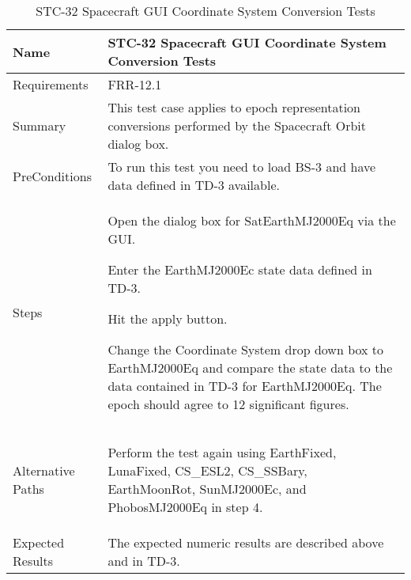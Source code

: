 
\begin{table}[htbp!]
\centering
      \begin{tabular}{|p{1.05 in} |p{4.75 in} |}
      \hline
         \rowcolor[rgb]{0.8,0.8,0.8} Name & STC-32 Spacecraft GUI Coordinate System Conversion Tests\\
         \hline
         Requirements & FRR-12.1\\ \hline
         Summary &
         This test case applies to epoch representation conversions performed by the Spacecraft Orbit dialog box.  \\
         \hline
         PreConditions & To run this test you need to load BS-3 and have data defined in TD-3 available.\\
         \hline
         Steps &
         \begin{compactenum}
         \item Open the dialog box for SatEarthMJ2000Eq via the GUI.
         \item Enter the EarthMJ2000Ec state data  defined in TD-3.
         \item Hit the apply button.
         \item Change the Coordinate System drop down box to EarthMJ2000Eq and compare the state data to
               the data contained in TD-3 for EarthMJ2000Eq. The epoch should agree to 12 significant
               figures.
         \end{compactenum}\\
		 \hline
         Alternative Paths &
         \begin{compactenum}
         \item Perform the test again using EarthFixed, LunaFixed, CS\_ESL2, CS\_SSBary, EarthMoonRot, SunMJ2000Ec, and PhobosMJ2000Eq in step 4.
         \end{compactenum}\\
         \hline
         Expected Results & The expected numeric results are described above and in TD-3.\\
      \hline
\end{tabular}
      \label{Table:STC-32}
      \caption{STC-32 Spacecraft GUI Coordinate System Conversion Tests}
\end{table} 